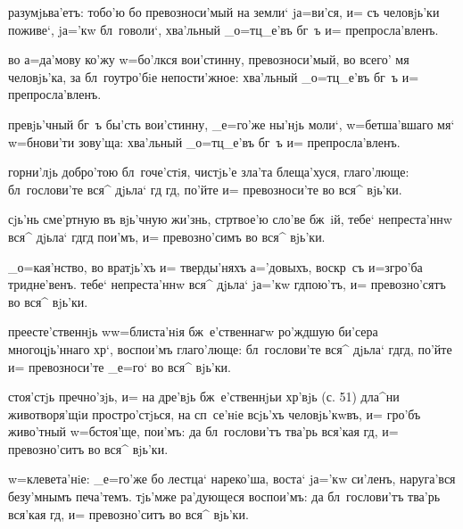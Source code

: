 разумjьва'етъ: тобо'ю бо превозноси'мый на земли` 
jа=ви'ся, и= съ человjь'ки поживе`, jа='кw бл~говоли`, 
хва'льный _о=тц_е'въ бг~ъ и= препросла'вленъ.

во а=да'мову ко'жу w=бо'лкся вои'стинну, превозноси'мый, 
во всего' мя человjь'ка, за бл~гоутро'бiе непости'жное: 
хва'льный _о=тц_е'въ бг~ъ и= препросла'вленъ.

превjь'чный бг~ъ бы'сть вои'стинну, _е=го'же ны'нjь 
моли`, w=бетша'вшаго мя` w=бнови'ти зову'ща: хва'льный 
_о=тц_е'въ бг~ъ и= препросла'вленъ.


горни'лjь добро'тою бл~гоче'стiя, чистjь'е зла'та 
блеща'хуся, глаго'люще: бл~гослови'те вся^ дjьла` гд 
гд, по'йте и= превозноси'те во вся^ вjь'ки.

сjь'нь сме'ртную въ вjь'чную жи'знь, стр твое'ю 
сло'ве бж~iй, тебе` непреста'ннw вся^ дjьла` гд гд 
пои'мъ, и= превозно'симъ во вся^ вjь'ки.

_о=кая'нство, во вратjь'хъ и= тверды'няхъ а='довыхъ, 
воскр~съ и=з\ъ гро'ба тридне'венъ. тебе` непреста'ннw 
вся^ дjьла` jа='кw гд пою'тъ, и= превозно'сятъ во вся^ 
вjь'ки.

преесте'ственнjь w\т w=блиста'нiя бж~е'ственнагw ро'ждшую 
би'сера многоцjь'ннаго хр`, воспои'мъ глаго'люще: 
бл~гослови'те вся^ дjьла` гд гд, по'йте и= 
превозноси'те _е=го` во вся^ вjь'ки.


стоя'стjь преч но'зjь, и= на дре'вjь бж~е'ственнjьи 
хр'вjь (с. 51) дла^ни животворя'щiи простро'стjься, 
на сп~се'нiе всjь'хъ человjь'кwвъ, и= гро'бъ живо'тный 
w=бстоя'ще, пои'мъ: да бл~гослови'тъ тва'рь вся'кая 
гд, и= превозно'ситъ во вся^ вjь'ки.

w=клевета'нiе: _е=го'же бо лестца` нареко'ша, воста` 
jа='кw си'ленъ, наруга'вся безу'мнымъ печа'темъ. тjь'мже 
ра'дующеся воспои'мъ: да бл~гослови'тъ тва'рь вся'кая 
гд, и= превозно'ситъ во вся^ вjь'ки.

